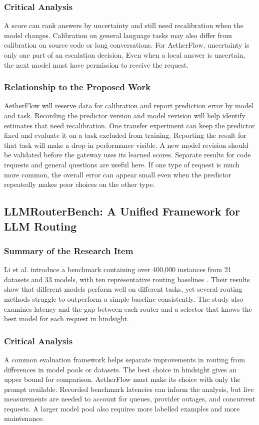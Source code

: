 \documentclass{FastFyp}
\begin{document}
\subsubsection{Critical Analysis}
A score can rank answers by uncertainty and still need recalibration when the model changes. Calibration on general language tasks may also differ from calibration on source code or long conversations. For AetherFlow, uncertainty is only one part of an escalation decision. Even when a local answer is uncertain, the next model must have permission to receive the request.

\subsubsection{Relationship to the Proposed Work}
AetherFlow will reserve data for calibration and report prediction error by model and task. Recording the predictor version and model revision will help identify estimates that need recalibration. One transfer experiment can keep the predictor fixed and evaluate it on a task excluded from training. Reporting the result for that task will make a drop in performance visible. A new model revision should be validated before the gateway uses its learned scores. Separate results for code requests and general questions are useful here. If one type of request is much more common, the overall error can appear small even when the predictor repeatedly makes poor choices on the other type.

\subsection{LLMRouterBench: A Unified Framework for LLM Routing}
\subsubsection{Summary of the Research Item}
Li et al. introduce a benchmark containing over 400,000 instances from 21 datasets and 33 models, with ten representative routing baselines \cite{ref:LLMRouterBench}. Their results show that different models perform well on different tasks, yet several routing methods struggle to outperform a simple baseline consistently. The study also examines latency and the gap between each router and a selector that knows the best model for each request in hindsight.

\subsubsection{Critical Analysis}
A common evaluation framework helps separate improvements in routing from differences in model pools or datasets. The best choice in hindsight gives an upper bound for comparison. AetherFlow must make its choice with only the prompt available. Recorded benchmark latencies can inform the analysis, but live measurements are needed to account for queues, provider outages, and concurrent requests. A larger model pool also requires more labelled examples and more maintenance.
\end{document}
